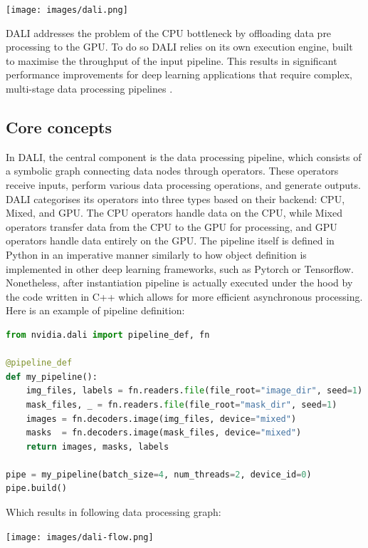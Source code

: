 \documentclass[licencjacka,en]{pracamgr}
\begin{document}
\centerline{\texttt{[image: images/dali.png]}}

DALI addresses the problem of the CPU bottleneck by offloading data pre processing to the GPU. To do so DALI relies on its own execution engine, built to maximise the throughput of the input pipeline. This results in significant performance improvements for deep learning applications that require complex, multi-stage data processing pipelines \cite{blogpost}. 


\subsection{Core concepts}
In DALI, the central component is the data processing pipeline, which consists of a symbolic graph connecting data nodes through operators. These operators receive inputs, perform various data processing operations, and generate outputs. DALI categorises its operators into three types based on their backend: CPU, Mixed, and GPU. The CPU operators handle data on the CPU, while Mixed operators transfer data from the CPU to the GPU for processing, and GPU operators handle data entirely on the GPU. The pipeline itself is defined in Python in an imperative manner similarly to how object definition is implemented in other deep learning frameworks, such as Pytorch or Tensorflow. Nonetheless, after instantiation pipeline is actually executed under the hood by the code written in C++ which allows for more efficient asynchronous processing. \cite{blogpost}   Here is an example of pipeline definition: \\ 

\begin{lstlisting}[language=Python]
from nvidia.dali import pipeline_def, fn

@pipeline_def  
def my_pipeline():
    img_files, labels = fn.readers.file(file_root="image_dir", seed=1)
    mask_files, _ = fn.readers.file(file_root="mask_dir", seed=1)
    images = fn.decoders.image(img_files, device="mixed")
    masks  = fn.decoders.image(mask_files, device="mixed")
    return images, masks, labels

pipe = my_pipeline(batch_size=4, num_threads=2, device_id=0)
pipe.build()
\end{lstlisting}

Which  results in following data processing graph: \cite{dali-docs} \\

\centerline{\texttt{[image: images/dali-flow.png]}}
\end{document}
